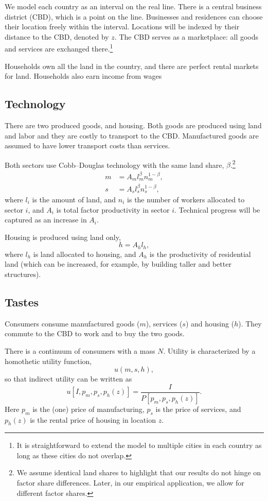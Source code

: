 \documentclass[12pt]{article}
\begin{document}
We model each country as an interval on the real line. There is a central business district (CBD), which is a point on the line. Businesses and residences can choose their location freely within the interval. Locations will be indexed by their distance to the CBD, denoted by $z$. The CBD serves as a marketplace: all goods and services are exchanged there.\footnote{It is straightforward to extend the model to multiple cities in each country as long as these cities do not overlap.}

Households own all the land in the country, and there are perfect rental markets for land. Households also earn income from wages 

\subsection{Technology}
There are two produced goods, and housing. Both goods are produced using land and labor and they are costly to transport to the CBD. Manufactured goods are assumed to have lower transport costs than services.

Both sectors use Cobb--Douglas technology with the same land share, $\beta$.\footnote{We assume identical land shares to highlight that our results do not hinge on factor share differences. Later, in our empirical application, we allow for different factor shares.}
\begin{align*}
m&=A_ml_m^\beta n_m^{1-\beta},\\
s&=A_sl_s^\beta n_s^{1-\beta},
\end{align*}
where $l_i$ is the amount of land, and $n_i$ is the number of workers allocated to sector $i$, and $A_i$ is total factor productivity in sector $i$. Technical progress will be captured as an increase in $A_i$.

Housing is produced using land only,
\[
 h=A_hl_h,
\]
where $l_h$ is land allocated to housing, and $A_h$ is the productivity of residential land (which can be increased, for example, by building taller and better structures).

\subsection{Tastes}
Consumers consume manufactured goods ($m$), services ($s$) and housing ($h$). They commute to the CBD to work and to buy the two goods.

There is a continuum of consumers with a mass $N$. Utility is characterized by a homothetic utility function,
\[
u(m,s,h),
\]
so that indirect utility can be written as
\[
u[I, p_m,p_s,p_h(z)] = \frac{I}{P[p_m,p_s,p_h(z)]}.
\]
Here $p_m$ is the (one) price of manufacturing, $p_s$ is the price of services, and $p_h(z)$ is the rental price of housing in location $z$. 
\end{document}
